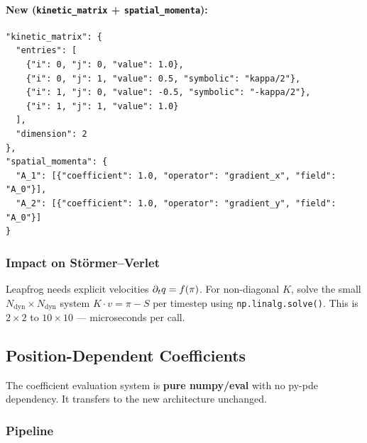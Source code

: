 \paragraph{New (\texttt{kinetic\_matrix} + \texttt{spatial\_momenta}):}
\label{par:new-json}

\begin{lstlisting}[style=json]
"kinetic_matrix": {
  "entries": [
    {"i": 0, "j": 0, "value": 1.0},
    {"i": 0, "j": 1, "value": 0.5, "symbolic": "kappa/2"},
    {"i": 1, "j": 0, "value": -0.5, "symbolic": "-kappa/2"},
    {"i": 1, "j": 1, "value": 1.0}
  ],
  "dimension": 2
},
"spatial_momenta": {
  "A_1": [{"coefficient": 1.0, "operator": "gradient_x", "field": "A_0"}],
  "A_2": [{"coefficient": 1.0, "operator": "gradient_y", "field": "A_0"}]
}
\end{lstlisting}

\subsubsection{Impact on St\"ormer--Verlet}
\label{sec:verlet-impact}

Leapfrog needs explicit velocities $\partial_t q = f(\pi)$. For non-diagonal $K$, solve
the small $N_\mathrm{dyn} \times N_\mathrm{dyn}$ system $K \cdot v = \pi - S$ per timestep using
\texttt{np.linalg.solve()}. This is $2\times 2$ to $10\times 10$ --- microseconds per call.

\subsection{Position-Dependent Coefficients}
\label{sec:pos-dep-coefficients}

The coefficient evaluation system is \textbf{pure numpy/eval} with no py-pde
dependency. It transfers to the new architecture unchanged.

\subsubsection{Pipeline}
\label{sec:coeff-pipeline}

